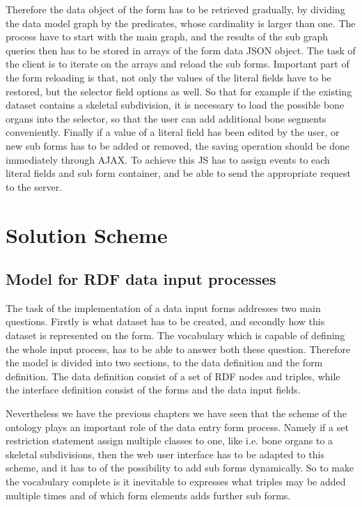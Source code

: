 Therefore the data object of the form has to be retrieved gradually, by dividing the data model graph by the predicates, whose cardinality is larger than one. The process have to start with the main graph, and the results of the sub graph queries then has to be stored in arrays of the form data JSON object. The task of the client is to iterate on the arrays and reload the sub forms. Important part of the form reloading is that, not only the values of the literal fields have to be restored, but the selector field options as well. So that for example if the existing dataset contains a skeletal subdivision, it is necessary to load the possible bone organs into the selector, so that the user can add additional bone segments conveniently.
Finally if a value of a literal field has been edited by the user, or new sub forms has to be added or removed, the saving operation should be done immediately through AJAX. 
To achieve this JS has to assign events to each literal fields and sub form container, and be able to send the appropriate request to the server.

\newpage
\section{Solution Scheme} \label{33}

\subsection{Model for RDF data input processes} \label{[331]}

The task of the implementation of a data input forms addresses two main questions. Firstly is what dataset has to be created, and secondly how this dataset is represented on the form. The vocabulary which is capable of defining the whole input process, has to be able to answer both these question. Therefore the model is divided into two sections, to the data definition and the form definition. The data definition consist of a set of RDF nodes and triples, while the interface definition consist of the forms and the data input fields.
 
Nevertheless we have the previous chapters we have seen that the scheme of the ontology plays an important role of the data entry form process. Namely if a set restriction statement assign multiple classes to one, like i.e. bone organs to a skeletal subdivisions, then the web user interface has to be adapted to this scheme, and it has to of the possibility to add sub forms dynamically. So to make the vocabulary complete is it inevitable to expresses what triples may be added multiple times and of which form elements adds further sub forms.


